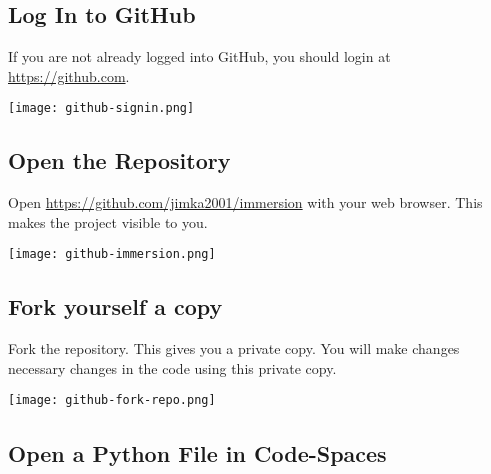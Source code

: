 \subsection{Log In to GitHub}
\label{sec.github.login}

If you are not already logged into GitHub, you should login at \url{https://github.com}.

\noindent\texttt{[image: github-signin.png]}


\clearpage
\subsection{Open the Repository}
\label{sec.open.repo}
  


Open \url{https://github.com/jimka2001/immersion} with your web browser.  This makes the project visible to you.

\nopagebreak
\noindent\texttt{[image: github-immersion.png]}


\subsection{Fork yourself a copy}

Fork the repository.  This gives you a private copy.  You will make changes
necessary changes in the code using this private copy.

\nopagebreak
\noindent \texttt{[image: github-fork-repo.png]}



\subsection{Open a Python File in Code-Spaces}
  

